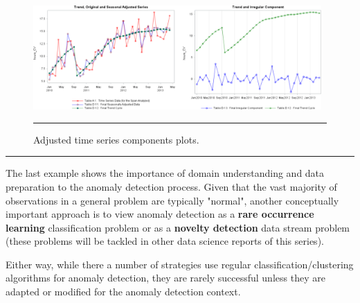 \begin{Example}
\begin{figure}[t]
\centering
\includegraphics[width=0.98\textwidth]{Images/adjustedplot.png}
\caption{\small Adjusted time series components plots.}\hrule
\label{fig:adjusted}
\end{figure}
\end{Example}
\begin{center}
    \rule{0.25\textwidth}{.4pt}
\end{center}
The last example shows the importance of domain understanding and data preparation to the anomaly detection process. Given that the vast majority of observations in a general problem are typically "normal", another conceptually important approach is to view anomaly detection as a \textbf{rare occurrence learning} classification problem or as a \textbf{novelty detection} data stream problem (these problems will be tackled in other data science reports of this series). \par Either way, while there a number of strategies use regular classification/clustering algorithms for anomaly detection, they are rarely successful unless they are adapted or modified for the anomaly detection context.  

